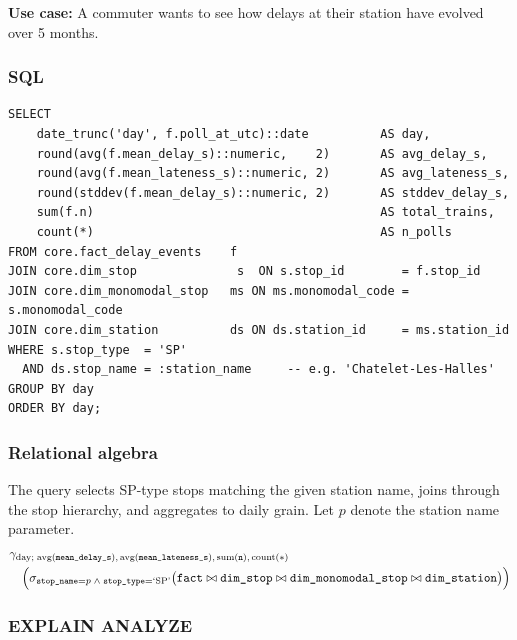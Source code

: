 \documentclass[a4paper,11pt]{article}
\begin{document}
\textbf{Use case:} A commuter wants to see how delays at their station have evolved over 5 months.
\subsubsection{SQL}

\begin{lstlisting}[style=sql, caption={Q5 --- station delay timeline
  (\texttt{sql/queries/q5\_station\_delay\_timeline.sql}).}]
SELECT
    date_trunc('day', f.poll_at_utc)::date          AS day,
    round(avg(f.mean_delay_s)::numeric,    2)       AS avg_delay_s,
    round(avg(f.mean_lateness_s)::numeric, 2)       AS avg_lateness_s,
    round(stddev(f.mean_delay_s)::numeric, 2)       AS stddev_delay_s,
    sum(f.n)                                        AS total_trains,
    count(*)                                        AS n_polls
FROM core.fact_delay_events    f
JOIN core.dim_stop              s  ON s.stop_id        = f.stop_id
JOIN core.dim_monomodal_stop   ms ON ms.monomodal_code = s.monomodal_code
JOIN core.dim_station          ds ON ds.station_id     = ms.station_id
WHERE s.stop_type  = 'SP'
  AND ds.stop_name = :station_name     -- e.g. 'Chatelet-Les-Halles'
GROUP BY day
ORDER BY day;
\end{lstlisting}

\subsubsection{Relational algebra}

The query selects SP-type stops matching the given station name, joins through
the stop hierarchy, and aggregates to daily grain.
Let $p$ denote the station name parameter.
\begin{align*}
  &\gamma_{\text{day};\;
    \text{avg}(\texttt{mean\_delay\_s}),\,
    \text{avg}(\texttt{mean\_lateness\_s}),\,
    \text{sum}(\texttt{n}),\,
    \text{count}(*)} \\
  &\quad\Bigl(
    \sigma_{\texttt{stop\_name}=p\;\land\;\texttt{stop\_type}=\text{`SP'}}
    \bigl(
      \texttt{fact} \bowtie \texttt{dim\_stop} \bowtie
      \texttt{dim\_monomodal\_stop} \bowtie \texttt{dim\_station}
    \bigr)
  \Bigr)
\end{align*}

\subsubsection{EXPLAIN ANALYZE}
\end{document}
